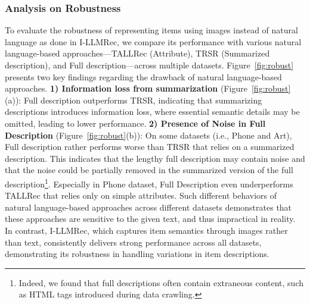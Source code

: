 \documentclass[sigconf]{acmart}
\newcommand{\proposed}{\textsf{I-LLMRec}}
\begin{document}
\subsubsection{\textbf{Analysis on Robustness}}
\label{sec:robust}
To evaluate the robustness of representing items using images instead of natural language as done in \proposed{}, we compare its performance with various natural language-based approaches—TALLRec (Attribute), TRSR (Summarized description), and \textsf{Full description}—across multiple datasets. Figure~\ref{fig:robust} presents two key findings regarding the drawback of natural language-based approaches. \textbf{1) Information loss from summarization} (Figure~\ref{fig:robust}(a)): \textsf{Full description} outperforms TRSR, indicating that summarizing descriptions introduces information loss, where essential semantic details may be omitted, leading to lower performance. \textbf{2) Presence of Noise in Full Description} (Figure~\ref{fig:robust}(b)): On some datasets (i.e., Phone and Art), \textsf{Full description} rather performs worse than TRSR that relies on a summarized description. This indicates that the lengthy full description may contain noise and that the noise could be partially removed in the summarized version of the full description\footnote{Indeed, we found that full descriptions often contain extraneous content, such as HTML tags introduced during data crawling.}.
Especially in Phone dataset, \textsf{Full Description} even underperforms TALLRec that relies only on simple attributes. 
Such different behaviors of natural language-based approaches across different datasets demonstrates that these approaches are sensitive to the given text, and thus impractical in reality.
In contrast, \proposed{}, which captures item semantics through images rather than text, consistently delivers strong performance across all datasets, 
demonstrating its robustness in handling variations in item descriptions.

\end{document}
